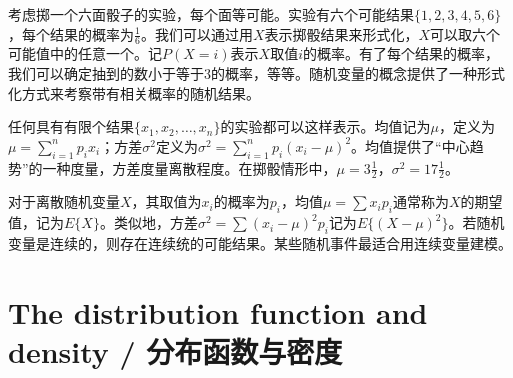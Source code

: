 \begin{translation}
考虑掷一个六面骰子的实验，每个面等可能。实验有六个可能结果$\{1,2,3,4,5,6\}$，每个结果的概率为$\frac{1}{6}$。我们可以通过用$X$表示掷骰结果来形式化，$X$可以取六个可能值中的任意一个。记$P(X = i)$表示$X$取值$i$的概率。有了每个结果的概率，我们可以确定抽到的数小于等于3的概率，等等。随机变量的概念提供了一种形式化方式来考察带有相关概率的随机结果。

任何具有有限个结果$\{x_1, x_2, \ldots, x_n\}$的实验都可以这样表示。均值记为$\mu$，定义为$\mu = \sum_{i=1}^{n} p_i x_i$；方差$\sigma^2$定义为$\sigma^2 = \sum_{i=1}^{n} p_i(x_i - \mu)^2$。均值提供了``中心趋势''的一种度量，方差度量离散程度。在掷骰情形中，$\mu = 3\frac{1}{2}$，$\sigma^2 = 17\frac{1}{2}$。

对于离散随机变量$X$，其取值为$x_i$的概率为$p_i$，均值$\mu = \sum x_i p_i$通常称为$X$的期望值，记为$E\{X\}$。类似地，方差$\sigma^2 = \sum (x_i - \mu)^2 p_i$记为$E\{(X - \mu)^2\}$。若随机变量是连续的，则存在连续统的可能结果。某些随机事件最适合用连续变量建模。
\end{translation}
\section{The distribution function and density / 分布函数与密度}

